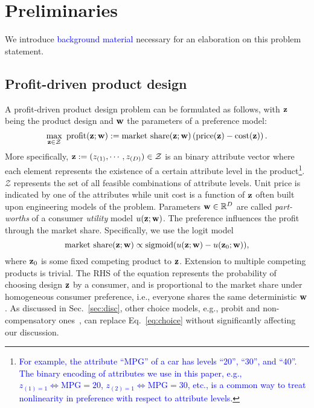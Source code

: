 \documentclass[onecolumn,11pt]{article}
\newcommand{\highlight}[1]{{\textcolor{blue}{{#1}}}}
\newcommand{\highlight}[1]{{{#1}}}
\begin{document}
\section{Preliminaries}
\label{sec:prelim}
We introduce \highlight{background material} necessary for an elaboration on this problem statement.
\subsection{Profit-driven product design}
\label{sec:productdesign}
A profit-driven product design problem can be formulated as follows, with ${\bf z}$ being the product design and ${\bf w}$ the parameters of a preference model: 
\begin{equation}
\max_{{\bf z}\in\mathcal{Z}} ~\text{profit}({\bf z};{\bf w}):= \text{market share}({\bf z};{\bf w})\left(\text{price}({\bf z}) - \text{cost}({\bf z})\right).
\label{eq:marketobj}
\end{equation}
More specifically, ${\bf z}:=(z_{(1)},\cdots,z_{(D)})\in \mathcal{Z}$ is an binary attribute vector where each element represents the existence of a certain attribute level in the product\footnote{\highlight{For example, the attribute ``MPG'' of a car has levels ``20'', ``30'', and ``40''. The binary encoding of attributes we use in this paper, e.g., $z_{(1)=1}\Leftrightarrow \text{MPG}=20$, $z_{(2)=1}\Leftrightarrow \text{MPG}=30$, etc., is a common way to treat nonlinearity in preference with respect to attribute levels.}}. $\mathcal{Z}$ represents the set of all feasible combinations of attribute levels. Unit price is indicated by one of the attributes while unit cost is a function of ${\bf z}$ often built upon engineering models of the problem. Parameters ${\bf w} \in \mathbb{R}^D$ are called {\it part-worths} of a consumer {\it utility} model $u({\bf z};{\bf w})$. The preference influences the profit through the market share. Specifically, we use the logit model~\cite{mcfadden1973conditional}
\begin{equation}
\text{market share}({\bf z};{\bf w}) \propto \text{sigmoid}(u({\bf z};{\bf w})-u({\bf z}_0;{\bf w})),
\label{eq:choice}
\end{equation} 
where ${\bf z}_0$ is some fixed competing product to ${\bf z}$. Extension to multiple competing products is trivial. The RHS of the equation represents the probability of choosing design ${\bf z}$ by a consumer, and is proportional to the market share under homogeneous consumer preference, i.e., everyone shares the same deterministic ${\bf w}$. 
As discussed in Sec.~\ref{sec:disc}, other choice models, e.g., probit and non-compensatory ones~\cite{hauser2010disjunctions,morrow2014market,shin2015modeling}, can replace Eq.~\eqref{eq:choice} without significantly affecting our discussion.
\end{document}
